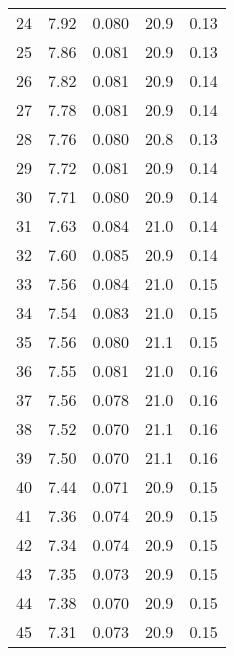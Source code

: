 \begin{table}
\begin{tabular}{c|ll|ll}
24 & 7.92 & 0.080 & 20.9 & 0.13 \\
25 & 7.86 & 0.081 & 20.9 & 0.13 \\
26 & 7.82 & 0.081 & 20.9 & 0.14 \\
27 & 7.78 & 0.081 & 20.9 & 0.14 \\
28 & 7.76 & 0.080 & 20.8 & 0.13 \\
29 & 7.72 & 0.081 & 20.9 & 0.14 \\
30 & 7.71 & 0.080 & 20.9 & 0.14 \\
31 & 7.63 & 0.084 & 21.0 & 0.14 \\
32 & 7.60 & 0.085 & 20.9 & 0.14 \\
33 & 7.56 & 0.084 & 21.0 & 0.15 \\
34 & 7.54 & 0.083 & 21.0 & 0.15 \\
35 & 7.56 & 0.080 & 21.1 & 0.15 \\
36 & 7.55 & 0.081 & 21.0 & 0.16 \\
37 & 7.56 & 0.078 & 21.0 & 0.16 \\
38 & 7.52 & 0.070 & 21.1 & 0.16 \\
39 & 7.50 & 0.070 & 21.1 & 0.16 \\
40 & 7.44 & 0.071 & 20.9 & 0.15 \\
41 & 7.36 & 0.074 & 20.9 & 0.15 \\
42 & 7.34 & 0.074 & 20.9 & 0.15 \\
43 & 7.35 & 0.073 & 20.9 & 0.15 \\
44 & 7.38 & 0.070 & 20.9 & 0.15 \\
45 & 7.31 & 0.073 & 20.9 & 0.15 \\
               \hline
        \end{tabular}
    \end{table}
    \clearpage


